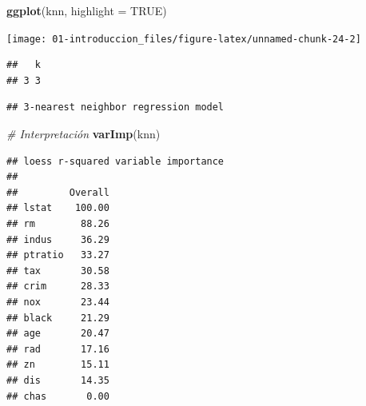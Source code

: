 \documentclass[]{book}
\newenvironment{Shaded}{\begin{snugshade}}{\end{snugshade}}
\newcommand{\KeywordTok}[1]{\textcolor[rgb]{0.13,0.29,0.53}{\textbf{#1}}}
\newcommand{\DataTypeTok}[1]{\textcolor[rgb]{0.13,0.29,0.53}{#1}}
\newcommand{\CommentTok}[1]{\textcolor[rgb]{0.56,0.35,0.01}{\textit{#1}}}
\newcommand{\OtherTok}[1]{\textcolor[rgb]{0.56,0.35,0.01}{#1}}
\newcommand{\OperatorTok}[1]{\textcolor[rgb]{0.81,0.36,0.00}{\textbf{#1}}}
\newcommand{\NormalTok}[1]{#1}
\theoremstyle{break}
\theoremstyle{definition}
\theoremstyle{definition}
\theoremstyle{definition}
\theoremstyle{remark}
\begin{document}
\begin{Shaded}
\begin{Highlighting}[]
\KeywordTok{ggplot}\NormalTok{(knn, }\DataTypeTok{highlight =} \OtherTok{TRUE}\NormalTok{)}
\end{Highlighting}
\end{Shaded}

\begin{center}\texttt{[image: 01-introduccion\_files/figure-latex/unnamed-chunk-24-2]} \end{center}

\begin{Shaded}
\end{Shaded}

\begin{verbatim}
##   k
## 3 3
\end{verbatim}

\begin{Shaded}
\end{Shaded}

\begin{verbatim}
## 3-nearest neighbor regression model
\end{verbatim}

\begin{Shaded}
\begin{Highlighting}[]
\CommentTok{# Interpretación}
\KeywordTok{varImp}\NormalTok{(knn)}
\end{Highlighting}
\end{Shaded}

\begin{verbatim}
## loess r-squared variable importance
## 
##         Overall
## lstat    100.00
## rm        88.26
## indus     36.29
## ptratio   33.27
## tax       30.58
## crim      28.33
## nox       23.44
## black     21.29
## age       20.47
## rad       17.16
## zn        15.11
## dis       14.35
## chas       0.00
\end{verbatim}

\begin{Shaded}
\end{Shaded}
\end{document}
